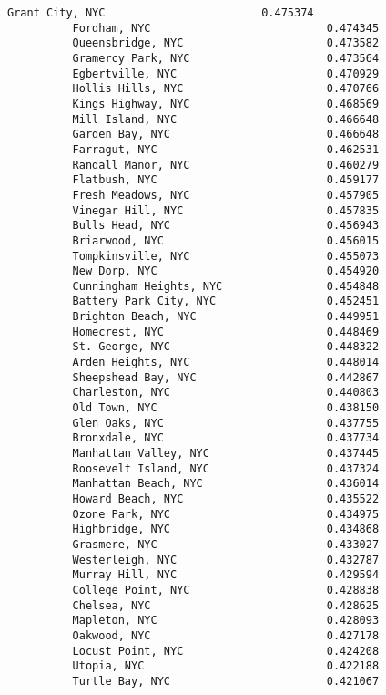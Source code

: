 \documentclass[11pt]{article}
\begin{document}
\begin{Verbatim}[commandchars=\\\{\}]
          Grant City, NYC                        0.475374
          Fordham, NYC                           0.474345
          Queensbridge, NYC                      0.473582
          Gramercy Park, NYC                     0.473564
          Egbertville, NYC                       0.470929
          Hollis Hills, NYC                      0.470766
          Kings Highway, NYC                     0.468569
          Mill Island, NYC                       0.466648
          Garden Bay, NYC                        0.466648
          Farragut, NYC                          0.462531
          Randall Manor, NYC                     0.460279
          Flatbush, NYC                          0.459177
          Fresh Meadows, NYC                     0.457905
          Vinegar Hill, NYC                      0.457835
          Bulls Head, NYC                        0.456943
          Briarwood, NYC                         0.456015
          Tompkinsville, NYC                     0.455073
          New Dorp, NYC                          0.454920
          Cunningham Heights, NYC                0.454848
          Battery Park City, NYC                 0.452451
          Brighton Beach, NYC                    0.449951
          Homecrest, NYC                         0.448469
          St. George, NYC                        0.448322
          Arden Heights, NYC                     0.448014
          Sheepshead Bay, NYC                    0.442867
          Charleston, NYC                        0.440803
          Old Town, NYC                          0.438150
          Glen Oaks, NYC                         0.437755
          Bronxdale, NYC                         0.437734
          Manhattan Valley, NYC                  0.437445
          Roosevelt Island, NYC                  0.437324
          Manhattan Beach, NYC                   0.436014
          Howard Beach, NYC                      0.435522
          Ozone Park, NYC                        0.434975
          Highbridge, NYC                        0.434868
          Grasmere, NYC                          0.433027
          Westerleigh, NYC                       0.432787
          Murray Hill, NYC                       0.429594
          College Point, NYC                     0.428838
          Chelsea, NYC                           0.428625
          Mapleton, NYC                          0.428093
          Oakwood, NYC                           0.427178
          Locust Point, NYC                      0.424208
          Utopia, NYC                            0.422188
          Turtle Bay, NYC                        0.421067

\end{Verbatim}
\end{document}
